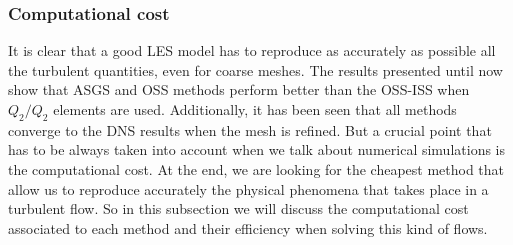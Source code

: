 \subsubsection{Computational cost}
It is clear that a good LES model has to reproduce as accurately as possible all the turbulent quantities, even for coarse meshes. The results presented until now show that ASGS and OSS methods perform better than the OSS-ISS when $Q_2/Q_2$ elements are used. Additionally, it has been seen that all methods converge to the DNS results when the mesh is refined. But a crucial point that has to be always taken into account when we talk about numerical simulations is the computational cost. At the end, we are looking for the cheapest method that allow us to reproduce accurately the physical phenomena that takes place in a turbulent flow. So in this subsection we will discuss the computational cost associated to each method and their efficiency when solving this kind of flows.

